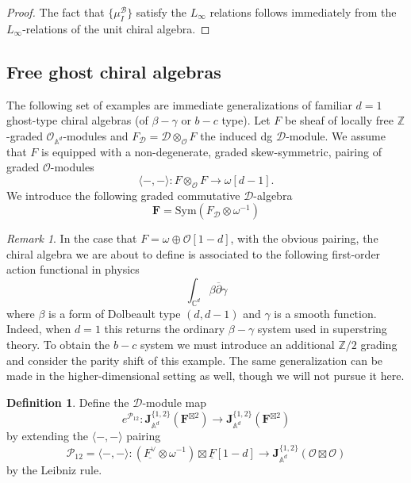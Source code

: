 \documentclass[11pt]{amsart}
\theoremstyle{definition}
\newtheorem{defn}[thm]{Definition}
\theoremstyle{remark}
\newtheorem{rem}[thm]{Remark}
\numberwithin{equation}{section}
\begin{document}
\begin{proof}
  The fact that $\{\mu_I^{\mathcal{B}}\}$ satisfy the $L_\infty$ relations follows immediately from the
  $L_\infty$-relations of the unit chiral algebra.
\end{proof}

\subsection{Free ghost chiral algebras}

The following set of examples are immediate generalizations of familiar $d=1$ ghost-type chiral algebras (of $\beta-\gamma$ or $b-c$
type).
Let $F$ be sheaf of locally free $\mathbb{Z}$-graded $\mathcal{O}_{\mathbb{A}^d}$-modules and $F_{\mathcal{D}} =
\mathcal{D} \otimes_{\mathcal{O}} F$ the induced dg $\mathcal{D}$-module.
We assume that $F$ is equipped with a non-degenerate, graded skew-symmetric, pairing of graded $\mathcal{O}$-modules
\begin{equation}\label{eq:pairing}
  \langle - , - \rangle \colon F \otimes_{\mathcal{O}} F \to \omega [d-1] .
\end{equation}
We introduce the following graded commutative $\mathcal{D}$-algebra
$$
\mathbf{F} =\mathrm{Sym}\left(F_{\mathcal{D}} \otimes \omega^{-1}\right)
$$

\begin{rem}
  In the case that $F= \omega \oplus \mathcal{O}[1-d]$, with the obvious pairing, the chiral algebra we are about to define is associated to the
  following first-order action functional in physics
  \begin{equation}\label{}
    \int_{\mathbb{C}^d} \beta \overline{\partial} \gamma
  \end{equation}
  where $\beta$ is a form of Dolbeault type $(d,d-1)$ and $\gamma$ is a smooth function.
  Indeed, when $d=1$ this returns the ordinary $\beta-\gamma$ system used in superstring theory.
  To obtain the $b-c$ system we must introduce an additional $\mathbb{Z}/2$ grading and consider the parity shift of this
  example.
  The same generalization can be made in the higher-dimensional setting as well, though we will not pursue it here.
\end{rem}

\begin{defn}{\label{WickContraction}}
Define the $\mathcal{D}$-module map
$$
e^{\mathcal{P}_{12}}\colon \mathbf{J}^{\{1,2\}}_{\mathbb{A}^d}(\mathbf{F}^{\boxtimes 2})\rightarrow \mathbf{J}^{\{1,2\}}
_{\mathbb{A}^d}(\mathbf{F}^{\boxtimes 2})
$$
by extending the $\langle - , - \rangle$ pairing 
$$
\mathcal{P}_{12} = \langle - , - \rangle \colon(\underline{F^{\vee}}\otimes\omega^{-1})\boxtimes \underline{F}[1-d]\rightarrow \mathbf{J}^{\{1,2\}}_{\mathbb{A}^d}(\mathcal{O}\boxtimes \mathcal{O})
$$
by the Leibniz rule.
\end{defn}
\end{document}

